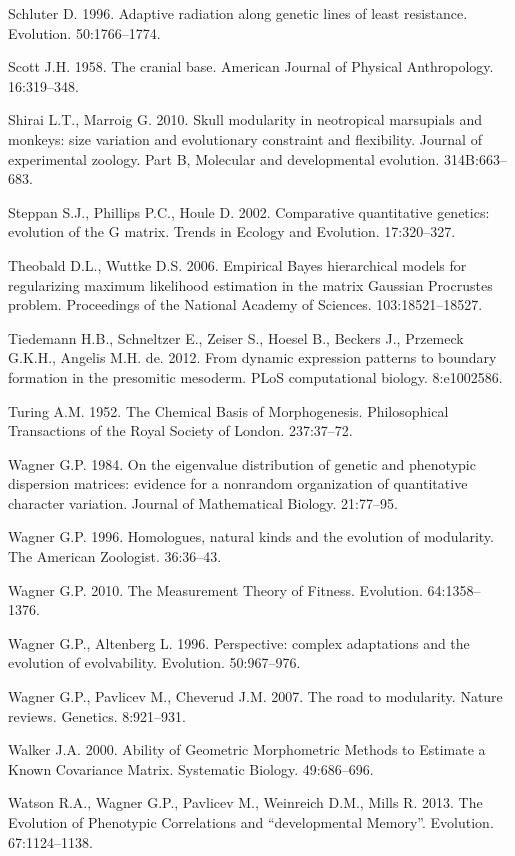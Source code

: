 \documentclass[12pt,]{article}
\begin{document}
Schluter D. 1996. Adaptive radiation along genetic lines of least
resistance. Evolution. 50:1766--1774.

Scott J.H. 1958. The cranial base. American Journal of Physical
Anthropology. 16:319--348.

Shirai L.T., Marroig G. 2010. Skull modularity in neotropical marsupials
and monkeys: size variation and evolutionary constraint and flexibility.
Journal of experimental zoology. Part B, Molecular and developmental
evolution. 314B:663--683.

Steppan S.J., Phillips P.C., Houle D. 2002. Comparative quantitative
genetics: evolution of the G matrix. Trends in Ecology and Evolution.
17:320--327.

Theobald D.L., Wuttke D.S. 2006. Empirical Bayes hierarchical models for
regularizing maximum likelihood estimation in the matrix Gaussian
Procrustes problem. Proceedings of the National Academy of Sciences.
103:18521--18527.

Tiedemann H.B., Schneltzer E., Zeiser S., Hoesel B., Beckers J.,
Przemeck G.K.H., Angelis M.H. de. 2012. From dynamic expression patterns
to boundary formation in the presomitic mesoderm. PLoS computational
biology. 8:e1002586.

Turing A.M. 1952. The Chemical Basis of Morphogenesis. Philosophical
Transactions of the Royal Society of London. 237:37--72.

Wagner G.P. 1984. On the eigenvalue distribution of genetic and
phenotypic dispersion matrices: evidence for a nonrandom organization of
quantitative character variation. Journal of Mathematical Biology.
21:77--95.

Wagner G.P. 1996. Homologues, natural kinds and the evolution of
modularity. The American Zoologist. 36:36--43.

Wagner G.P. 2010. The Measurement Theory of Fitness. Evolution.
64:1358--1376.

Wagner G.P., Altenberg L. 1996. Perspective: complex adaptations and the
evolution of evolvability. Evolution. 50:967--976.

Wagner G.P., Pavlicev M., Cheverud J.M. 2007. The road to modularity.
Nature reviews. Genetics. 8:921--931.

Walker J.A. 2000. Ability of Geometric Morphometric Methods to Estimate
a Known Covariance Matrix. Systematic Biology. 49:686--696.

Watson R.A., Wagner G.P., Pavlicev M., Weinreich D.M., Mills R. 2013.
The Evolution of Phenotypic Correlations and ``developmental Memory''.
Evolution. 67:1124--1138.
\end{document}
